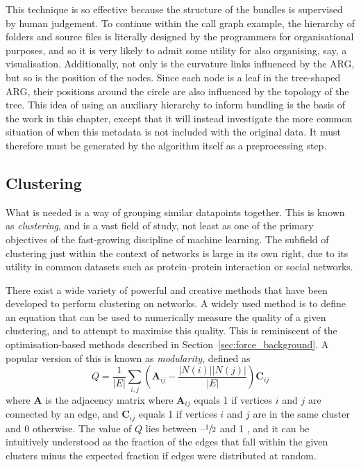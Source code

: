 This technique is so effective because the structure of the bundles is supervised by human judgement. To continue within the call graph example, the hierarchy of folders and source files is literally designed by the programmers for organisational purposes, and so it is very likely to admit some utility for also organising, say, a visualisation.
Additionally, not only is the curvature links influenced by the ARG, but so is the position of the nodes. Since each node is a leaf in the tree-shaped ARG, their positions around the circle are also influenced by the topology of the tree.
This idea of using an auxiliary hierarchy to inform bundling is the basis of the work in this chapter, except that it will instead investigate the more common situation of when this metadata is not included with the original data. It must therefore must be generated by the algorithm itself as a preprocessing step.

\subsection{Clustering}
\label{sec:clustering_background}
What is needed is a way of grouping similar datapoints together. This is known as \textit{clustering}, and is a vast field of study, not least as one of the primary objectives of the fast-growing discipline of machine learning. The subfield of clustering just within the context of networks is large in its own right, due to its utility in common datasets such as protein--protein interaction or social networks.

There exist a wide variety of powerful and creative methods that have been developed to perform clustering on networks. A widely used method is to define an equation that can be used to numerically measure the quality of a given clustering, and to attempt to maximise this quality. This is reminiscent of the optimisation-based methods described in Section~\ref{sec:force_background}.
A popular version of this is known as \emph{modularity}, defined as
\begin{equation}
  Q = \frac{1}{|E|}\sum_{i,j}\left(\mathbf{A}_{ij} - \frac{|N(i)||N(j)|}{|E|}\right)\mathbf{C}_{ij}
  \label{eq:modularity}
\end{equation}
where $\mathbf{A}$ is the adjacency matrix where $\mathbf{A}_{ij}$ equals 1 if vertices $i$ and $j$ are connected by an edge, and $\mathbf{C}_{ij}$ equals 1 if vertices $i$ and $j$ are in the same cluster and 0 otherwise.
The value of $Q$ lies between $\text{--}\sfrac{1}{2}$ and 1 \cite{Brandes2007Modularity}, and it can be intuitively understood as the fraction of the edges that fall within the given clusters minus the expected fraction if edges were distributed at random.


